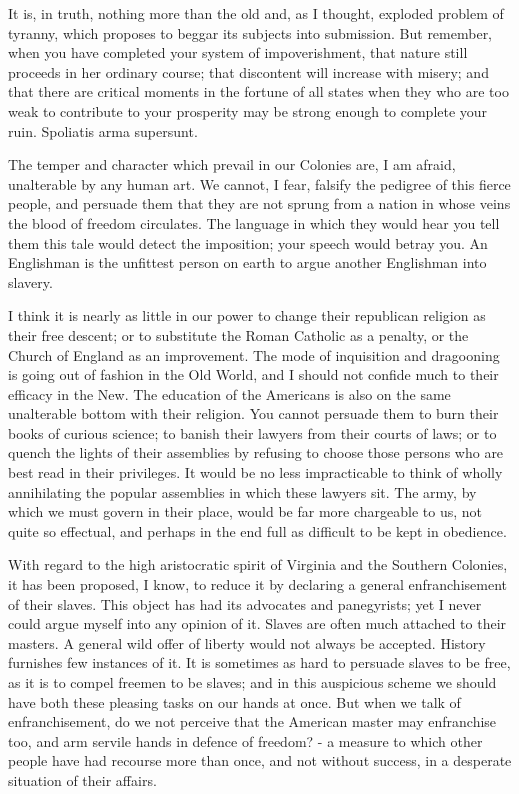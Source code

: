 It is, in truth, nothing more than the old and, as I thought, exploded problem of tyranny, which proposes to beggar its subjects into submission. But remember, when you have completed your system of impoverishment, that nature still proceeds in her ordinary course; that discontent will increase with misery; and that there are critical moments in the fortune of all states when they who are too weak to contribute to your prosperity may be strong enough to complete your ruin. Spoliatis arma supersunt.\par

The temper and character which prevail in our Colonies are, I am afraid, unalterable by any human art. We cannot, I fear, falsify the pedigree of this fierce people, and persuade them that they are not sprung from a nation in whose veins the blood of freedom circulates. The language in which they would hear you tell them this tale would detect the imposition; your speech would betray you. An Englishman is the unfittest person on earth to argue another Englishman into slavery.\par

I think it is nearly as little in our power to change their republican religion as their free descent; or to substitute the Roman Catholic as a penalty, or the Church of England as an improvement. The mode of inquisition and dragooning is going out of fashion in the Old World, and I should not confide much to their efficacy in the New. The education of the Americans is also on the same unalterable bottom with their religion. You cannot persuade them to burn their books of curious science; to banish their lawyers from their courts of laws; or to quench the lights of their assemblies by refusing to choose those persons who are best read in their privileges. It would be no less impracticable to think of wholly annihilating the popular assemblies in which these lawyers sit. The army, by which we must govern in their place, would be far more chargeable to us, not quite so effectual, and perhaps in the end full as difficult to be kept in obedience.\par

With regard to the high aristocratic spirit of Virginia and the Southern Colonies, it has been proposed, I know, to reduce it by declaring a general enfranchisement of their slaves. This object has had its advocates and panegyrists; yet I never could argue myself into any opinion of it. Slaves are often much attached to their masters. A general wild offer of liberty would not always be accepted. History furnishes few instances of it. It is sometimes as hard to persuade slaves to be free, as it is to compel freemen to be slaves; and in this auspicious scheme we should have both these pleasing tasks on our hands at once. But when we talk of enfranchisement, do we not perceive that the American master may enfranchise too, and arm servile hands in defence of freedom? - a measure to which other people have had recourse more than once, and not without success, in a desperate situation of their affairs.\par

